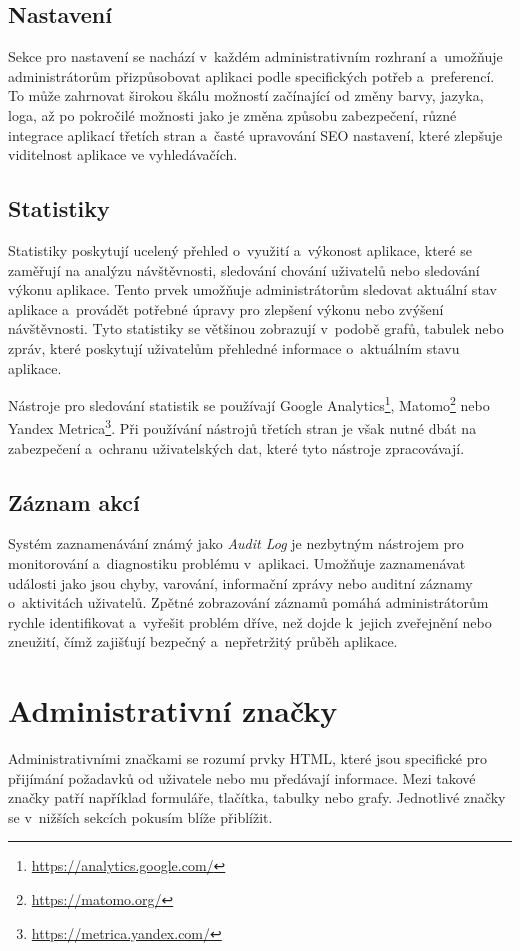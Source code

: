 \subsection{Nastavení}
\label{subsec:admin-elements-settings}
Sekce pro nastavení se nachází v~každém administrativním rozhraní a~umožňuje administrátorům přizpůsobovat aplikaci podle specifických potřeb a~preferencí. To může zahrnovat širokou škálu možností začínající od změny barvy, jazyka, loga, až po pokročilé možnosti jako je změna způsobu zabezpečení, různé integrace aplikací třetích stran a~časté upravování SEO nastavení, které zlepšuje viditelnost aplikace ve vyhledávačích.

\subsection{Statistiky}
\label{subsec:admin-elements-statistics}
Statistiky poskytují ucelený přehled o~využití a~výkonost aplikace, které se zaměřují na analýzu návštěvnosti, sledování chování uživatelů nebo sledování výkonu aplikace. Tento prvek umožňuje administrátorům sledovat aktuální stav aplikace a~provádět potřebné úpravy pro zlepšení výkonu nebo zvýšení návštěvnosti. Tyto statistiky se většinou zobrazují v~podobě grafů, tabulek nebo zpráv, které poskytují uživatelům přehledné informace o~aktuálním stavu aplikace.

Nástroje pro sledování statistik se používají Google Analytics\footnote[4]{\url{https://analytics.google.com/}}, Matomo\footnote[5]{\url{https://matomo.org/}} nebo Yandex Metrica\footnote[6]{\url{https://metrica.yandex.com/}}. Při používání nástrojů třetích stran je však nutné dbát na zabezpečení a~ochranu uživatelských dat, které tyto nástroje zpracovávají.

\subsection{Záznam akcí}
\label{subsec:admin-elements-logs}
Systém zaznamenávání známý jako \textit{Audit Log} je nezbytným nástrojem pro monitorování a~diagnostiku problému v~aplikaci. Umožňuje zaznamenávat události jako jsou chyby, varování, informační zprávy nebo auditní záznamy o~aktivitách uživatelů. Zpětné zobrazování záznamů pomáhá administrátorům rychle identifikovat a~vyřešit problém dříve, než dojde k~jejich zveřejnění nebo zneužití, čímž zajišťují bezpečný a~nepřetržitý průběh aplikace.

\section{Administrativní značky}
\label{sec:admin-tags}
Administrativními značkami se rozumí prvky HTML, které jsou specifické pro přijímání požadavků od uživatele nebo mu předávají informace. Mezi takové značky patří například formuláře, tlačítka, tabulky nebo grafy. Jednotlivé značky se v~nižších sekcích pokusím blíže přiblížit.

